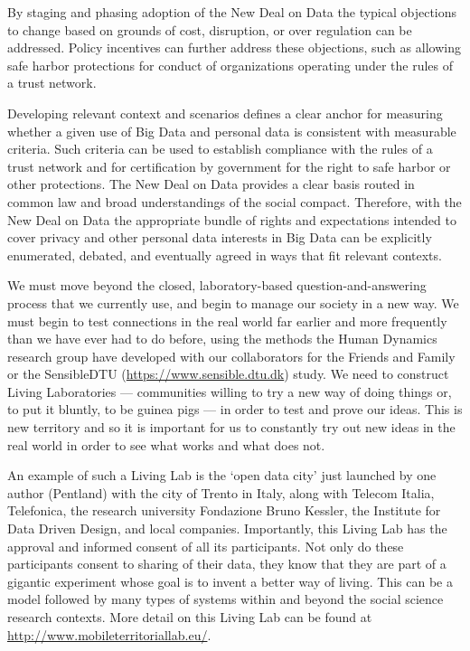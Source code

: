 By staging and phasing adoption of the New Deal on Data the typical objections 
to change based on grounds of cost, disruption, or over regulation can be addressed.
Policy incentives can further address these objections, such as allowing safe harbor protections
for conduct of organizations operating under the rules of a trust network.  
 
Developing relevant context and scenarios defines a clear anchor for 
measuring whether a given use of Big Data and personal data is consistent with measurable criteria.
Such criteria can be used to establish compliance with the rules of a trust network and 
for certification by government for the right to safe harbor or other protections.
The New Deal on Data provides a clear basis routed in common law and broad understandings of the social compact.
Therefore, with the New Deal on Data the appropriate bundle of rights and 
expectations intended to cover privacy and other personal data interests in 
Big Data can be explicitly enumerated, debated, and eventually agreed in ways that fit relevant contexts.  


We must move beyond the closed, laboratory-based question-and-answering process that we currently use, 
and begin to manage our society in a new way.
We must begin to test connections in the real world far earlier and 
more frequently than we have ever had to do before, 
using the methods the Human Dynamics research group have developed with our collaborators for the Friends and Family~\cite{aharony2011social} or the SensibleDTU (\url{https://www.sensible.dtu.dk}) study. 
We need to construct Living Laboratories ---
communities willing to try a new way of doing things or, to put it bluntly, to be guinea pigs --- 
in order to test and prove our ideas.
This is new territory and so it is important for us to constantly try out 
new ideas in the real world in order to see what works and what does not.

An example of such a Living Lab is the `open data city' just launched 
by one author (Pentland) with the city of Trento in Italy, along with 
Telecom Italia, Telefonica, the research university Fondazione Bruno Kessler, 
the Institute for Data Driven Design, and local companies.
Importantly, this Living Lab has the approval and informed consent of all its participants.  
Not only do these participants consent to sharing of their data, 
they know that they are part of a gigantic experiment whose 
goal is to invent a better way of living.  
This can be a model followed by many types of systems 
within and beyond the social science research contexts.  
More detail on this Living Lab can be found at \url{http://www.mobileterritoriallab.eu/}.




